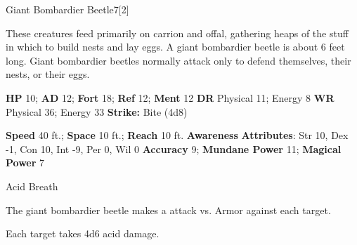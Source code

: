   \begin{monsection}{Giant Bombardier Beetle}{7}[2]
    \vspace{-1em}\vspace{-1em}
    \vspace{0em}

    
      These creatures feed primarily on carrion and offal, gathering heaps of the stuff in which to build nests and lay eggs.
      A giant bombardier beetle is about 6 feet long. Giant bombardier beetles normally attack only to defend themselves, their nests, or their eggs.
    

    \begin{spellcontent}
      \begin{spelltargetinginfo}
        \pari \textbf{HP} 10;
          \textbf{AD} 12;
          \textbf{Fort} 18;
          \textbf{Ref} 12;
          \textbf{Ment} 12
        \pari \textbf{DR} Physical 11; Energy 8
        \pari \textbf{WR} Physical 36; Energy 33
        \pari \textbf{Strike:}
            Bite  (4d8)
      \end{spelltargetinginfo}
    \end{spellcontent}
    \begin{monsterfooter}
      \pari \textbf{Speed} 40 ft.;
        \textbf{Space} 10 ft.;
        \textbf{Reach} 10 ft.
      \pari \textbf{Awareness} 
      \pari \textbf{Attributes}:
        Str 10, Dex -1,
        Con 10, Int -9,
        Per 0, Wil 0
      \pari \textbf{Accuracy} 9;
        \textbf{Mundane Power} 11;
      \textbf{Magical Power} 7
    \end{monsterfooter}
  \end{monsection}
  \begin{freeability}{Acid Breath}
      
      The giant bombardier beetle makes a  attack
        vs. Armor against each target.
    
    \hit Each target takes 4d6 acid damage.
    \end{freeability}
  

